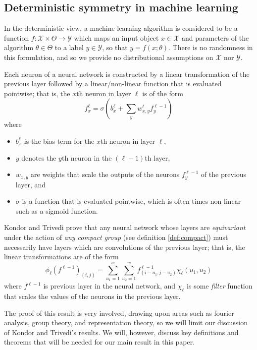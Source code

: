 \subsection{Deterministic symmetry in machine learning}
In the deterministic view, a machine learning algorithm is considered to be a function $f: \mathcal{X} \times \Theta \to \mathcal{Y}$ which maps an input object $x \in \mathcal{X}$ and parameters of the algorithm $\theta \in \Theta$ to a label $y \in \mathcal{Y}$, so that $y = f(x;\theta)$.
There is no randomness in this formulation, and so we provide no distributional assumptions on $\mathcal{X}$ nor $\mathcal{Y}$.

Each neuron of a neural network is constructed by a linear transformation of the previous layer followed by a linear/non-linear function that is evaluated pointwise; that is, the $x$th neuron in layer $\ell$ is of the form
$$
	f_{x}^{\ell} = \sigma \left( b_{x}^{\ell} + \sum_{y} w_{x,y}^{\ell} f_{y}^{\ell - 1} \right)
$$
where
\begin{itemize}
\item
$b_x^{\ell}$ is the bias term for the $x$th neuron in layer $\ell$,
\item
$y$ denotes the $y$th neuron in the $(\ell-1)$th layer,
\item 
$w_{x,y}$ are weights that scale the outputs of the neurons $f_y^{\ell - 1}$ of the previous layer, and
\item
$\sigma$ is a function that is evaluated pointwise, which is often times non-linear such as a sigmoid function.
\end{itemize} 
 
Kondor and Trivedi \cite{kondor2018generalization} prove that any neural network whose layers are \textit{equivariant} under the action of \textit{any compact group} (see definition \ref{def:compact}) must necessarily have layers which are convolutions of the previous layer; that is, the linear transformations are of the form
$$
	\phi_{\ell}(f^{\ell - 1})_{(i,j)} = \sum_{u_1 = 1}^{w} \sum_{u_2 = 1}^w f^{\ell - 1}_{(i - u_1, j - u_2)} \chi_{\ell}(u_1,u_2)
$$
where $f^{\ell-1}$ is previous layer in the neural network, and $\chi_{\ell}$ is some \textit{filter} function that scales the values of the neurons in the previous layer.

The proof of this result is very involved, drawing upon areas such as fourier analysis, group theory, and representation theory, so we will limit our discussion of Kondor and Trivedi's results.
We will, however, discuss key definitions and theorems that will be needed for our main result in this paper. 

